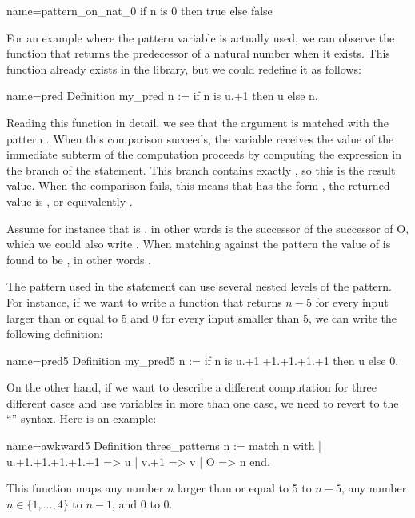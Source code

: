 \begin{coq}{name=pattern_on_nat_0}{}
if n is 0 then true else false
\end{coq}

For an example where the pattern variable is actually used, we can
observe the function that returns the predecessor of a natural number
when it exists.  This function already exists in the library, but we
could redefine it as follows:

\begin{coq}{name=pred}{}
Definition my_pred n := if n is u.+1 then u else n.
\end{coq}
Reading this function in detail, we see that the argument  is
matched with the pattern .  When this comparison
succeeds, the variable  receives the value of the immediate
subterm of  the computation proceeds by computing the expression
in the  branch of the  statement.  This branch contains
exactly , so this is the result value.  When the comparison
fails, this means that  has the form , the returned value is
, or equivalently .

Assume for instance that  is , in other words  is the
successor of the successor of O, which we could also write
.  When matching  against the pattern 
the value of  is found to be , in other words .

The pattern used in the  statement can use several nested levels
of the  pattern.  For instance, if we want to write a function
that returns \(n-5\) for every input larger than or equal to 5 and 0
for every input smaller than 5, we can write the following definition:

\begin{coq}{name=pred5}{}
Definition my_pred5 n :=
  if n is u.+1.+1.+1.+1.+1 then u else 0.
\end{coq}
On the other hand, if we want to describe a different computation for
three different cases and use variables in more than one case, we need
to revert to the ``'' syntax.  Here is an
example:

\begin{coq}{name=awkward5}{}
Definition three_patterns n :=
  match n with
  | u.+1.+1.+1.+1.+1 => u
  | v.+1 => v
  | O => n
  end.
\end{coq}
This function maps any number \(n\) larger than or equal to 5 to \(n-5\),
any number \(n \in \{1, \ldots, 4\}\) to \(n-1\), and \(0\) to \(0\).


